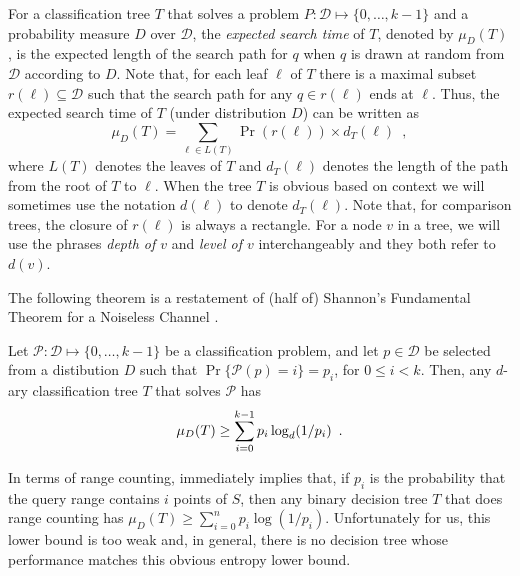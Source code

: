 \documentclass[charterfonts]{patmorin}
\newcommand{\depth}{d}
\begin{document}
For a classification tree $T$ that solves a problem
$P:\mathcal{D}\mapsto\{0,\ldots,k-1\}$ and a probability measure $D$
over $\mathcal{D}$, the \emph{expected search time} of $T$, denoted
by $\mu_D(T)$, is the
expected length of the search path for $q$ when $q$ is drawn at random
from $\mathcal{D}$ according to $D$.  Note that, for each leaf $\ell$
of $T$ there is a maximal subset $r(\ell)\subseteq \mathcal{D}$ such
that the search path for any $q\in r(\ell)$ ends at $\ell$.  Thus, the
expected search time of $T$ (under distribution $D$) can be written as
\[
     \mu_D(T) = \sum_{\ell\in L(T)} \Pr(r(\ell))\times \depth_T(\ell)
	\enspace ,
\]
where $L(T)$ denotes the leaves of $T$ and $\depth_T(\ell)$ denotes the
length of the path from the root of $T$ to $\ell$.  When the tree $T$
is obvious based on context we will sometimes use the notation
$d(\ell)$ to denote $d_T(\ell)$. Note that, for
comparison trees, the closure of $r(\ell)$ is always a rectangle.  For
a node $v$ in a tree, we will use the phrases \emph{depth of $v$} and
\emph{level of $v$} interchangeably and they both refer to $d(v)$. 

The following theorem is a restatement of (half of) Shannon's
Fundamental Theorem for a Noiseless Channel \cite[Theorem 9]{s48}.
\begin{thm}
Let $\mathcal{P}:\mathcal{D}\mapsto \{0,\ldots,k-1\}$ be a classification
problem, and let $p\in \mathcal{D}$ be selected from a distibution $D$ such
that $\Pr\{\mathcal{P}(p)= i\}=p_i$, for $0\le i< k$.  Then, any
$d$-ary classification tree $T$ that solves $\mathcal{P}$ has
\begin{equation}
     \mu_D(T) \ge \sum_{i=0}^{k-1} p_i\log_d(1/p_i) \enspace .
	\eqlabel{shannon}
\end{equation}
\end{thm}

In terms of range counting,  immediately implies that,
if $p_i$ is the probability that the query range contains $i$ points
of $S$, then any binary decision tree $T$ that does range counting has
$\mu_D(T) \ge \sum_{i=0}^{n} p_i\log(1/p_i)$.  Unfortunately for us,
this lower bound is too weak and, in general, there is no decision
tree whose performance matches this obvious entropy lower bound.
\end{document}
